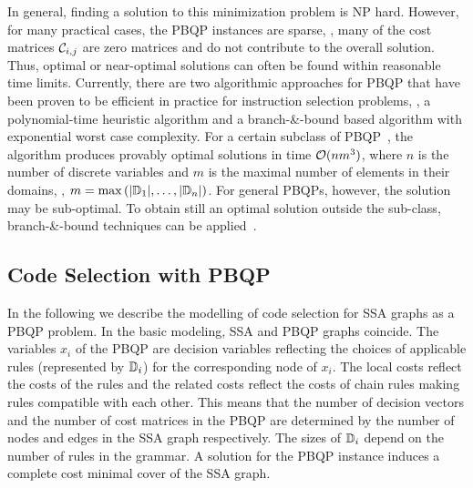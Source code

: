 In general, finding a solution to this minimization problem is NP
hard.  However, for many practical cases, the PBQP instances are
sparse, \ie, many of the cost matrices ${\mathcal C}_{i,j}$ are
zero matrices and do not contribute to the overall solution. Thus,
optimal or near-optimal solutions can often be found within reasonable
time limits.
Currently, there are two algorithmic approaches for PBQP that have been
proven to be efficient in practice for instruction selection problems,
\ie, a polynomial-time heuristic algorithm and a branch-\&-bound based
algorithm with exponential worst case complexity.
For a certain subclass of PBQP~\cite{ScholzE02,Eck03}, the algorithm 
produces provably optimal solutions in time
${\cal O}(n m^3)$, where $n$ is the number of discrete variables and
$m$ is the maximal number of elements in their domains, \ie, $m=\max
\left(|\mathbb D_1|,\ldots,|\mathbb D_n\right|)$. For general
{PBQP}s, however, the solution may be sub-optimal. To obtain
still an optimal solution outside the sub-class, branch-\&-bound 
techniques can be applied~\cite{DBLP:conf/jmlc/HamesS06}. 

\subsection{Code Selection with PBQP}
In the following we describe the modelling of code selection for SSA graphs
as a PBQP problem.  In the basic modeling, SSA and PBQP graphs coincide. 
The variables $x_i$ of the PBQP are decision variables reflecting the 
choices of applicable rules (represented by $\mathbb D_i$) for the 
corresponding node of $x_i$. The local costs reflect the costs of the rules
and the related costs reflect the costs of chain rules making rules compatible
with each other.  This means that the number of
decision vectors and the number of cost matrices in the PBQP are determined by the
number of nodes and edges in the SSA graph respectively.  The sizes of $\mathbb D_i$
depend on the number of rules in the grammar. A solution
for the PBQP instance induces a complete cost minimal cover of the SSA
graph.

